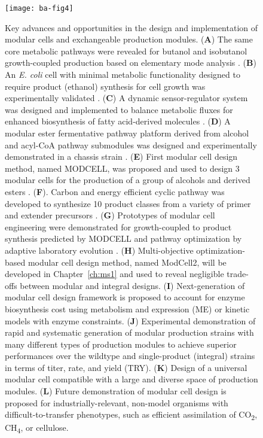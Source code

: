 \begin{figure}[h]
  \centering
  \texttt{[image: ba-fig4]}
    \caption[Key advances and opportunities in the design and
    implementation of modular cells and exchangeable production modules]{Key advances and opportunities in the design and
implementation of modular cells and exchangeable production modules.
    (\textbf{A}) The same core metabolic pathways were revealed for butanol
and isobutanol growth-coupled production based on elementary mode
analysis \citep{trinh2012}. (\textbf{B}) An \emph{E. coli}
cell with minimal metabolic functionality designed to require product
(ethanol) synthesis for cell growth was experimentally validated
\citep{trinh2008}. (\textbf{C}) A dynamic sensor-regulator
system was designed and implemented to balance metabolic fluxes for
enhanced biosynthesis of fatty acid-derived molecules
\citep{zhang2012}. (\textbf{D}) A modular ester fermentative
pathway platform derived from alcohol and acyl-CoA pathway submodules
was designed and experimentally demonstrated in a chassis strain
\citep{layton2014}. (\textbf{E}) First modular cell design
method, named MODCELL, was proposed and used to design 3 modular cells
for the production of a group of alcohols and derived esters
\citep{trinh2015}. (\textbf{F}). Carbon and energy efficient
cyclic pathway was developed to synthesize 10 product classes from a
variety of primer and extender precursors \citep{cheong2016}.
(\textbf{G}) Prototypes of modular cell engineering were demonstrated
for growth-coupled to product synthesis predicted by MODCELL
\citep{trinh2015} and pathway optimization by adaptive
laboratory evolution \citep{wilbanks2017}. (\textbf{H})
Multi-objective optimization-based modular cell design method, named
ModCell2, will be developed in Chapter~\ref{ch:ms1} and used to reveal negligible trade-offs
between modular and integral designs.
(\textbf{I}) Next-generation of modular cell design framework is
proposed to account for enzyme biosynthesis cost using metabolism and
expression (ME) or kinetic models with enzyme constraints. (\textbf{J})
Experimental demonstration of rapid and systematic generation of modular
production strains with many different types of production modules to
achieve superior performances over the wildtype and single-product
(integral) strains in terms of titer, rate, and yield (TRY).
(\textbf{K}) Design of a universal modular cell compatible with a large
and diverse space of production modules. (\textbf{L}) Future
demonstration of modular cell design is proposed for
industrially-relevant, non-model organisms with difficult-to-transfer
phenotypes, such as efficient assimilation of CO\textsubscript{2},
    CH\textsubscript{4}, or cellulose.}
    \label{fig:ba-fig4}
\end{figure}


